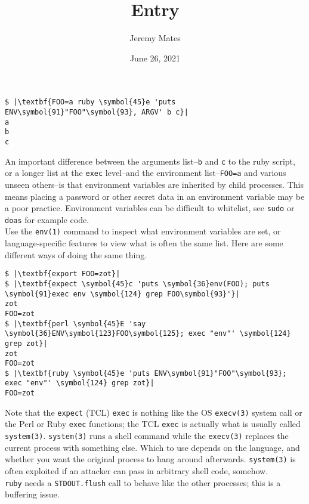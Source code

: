 \documentclass[10pt,a4paper]{article}
\title{Entry}
\author{Jeremy Mates}
\date{June 26, 2021}
\begin{document}
\renewcommand{\thefootnote}{\alph{footnote}}

\maketitle

\begin{lstlisting}
$ |\textbf{FOO=a ruby \symbol{45}e 'puts ENV\symbol{91}"FOO"\symbol{93}, ARGV' b c}|
a
b
c
\end{lstlisting}

An important difference between the arguments list--\texttt{b} and
\texttt{c} to the ruby script, or a longer list at the \texttt{exec}
level--and the environment list--\texttt{FOO=a} and various unseen
others--is that environment variables are inherited by child processes.
This means placing a password or other secret data in an environment
variable may be a poor practice. Environment variables can be difficult
to whitelist, see \texttt{sudo} or \texttt{doas} for example code. \\

Use the \texttt{env(1)} command to inspect what environment variables
are set, or language-specific features to view what is often the same
list. Here are some different ways of doing the same thing.

\begin{lstlisting}
$ |\textbf{export FOO=zot}|
$ |\textbf{expect \symbol{45}c 'puts \symbol{36}env(FOO); puts \symbol{91}exec env \symbol{124} grep FOO\symbol{93}'}|
zot
FOO=zot
$ |\textbf{perl \symbol{45}E 'say \symbol{36}ENV\symbol{123}FOO\symbol{125}; exec "env"' \symbol{124} grep zot}|
zot
FOO=zot
$ |\textbf{ruby \symbol{45}e 'puts ENV\symbol{91}"FOO"\symbol{93}; exec "env"' \symbol{124} grep zot}|
FOO=zot
\end{lstlisting}

Note that the \texttt{expect} (TCL) \texttt{exec} is nothing like the OS
\texttt{execv(3)} system call or the Perl or Ruby \texttt{exec}
functions; the TCL \texttt{exec} is actually what is usually called
\texttt{system(3)}. \texttt{system(3)} runs a shell command while the
\texttt{execv(3)} replaces the current process with something else.
Which to use depends on the language, and whether you want the original
process to hang around afterwards. \texttt{system(3)} is often exploited
if an attacker can pass in arbitrary shell code, somehow. \\

\texttt{ruby} needs a \texttt{STDOUT.flush} call to behave like the
other processes; this is a buffering issue.
\end{document}
